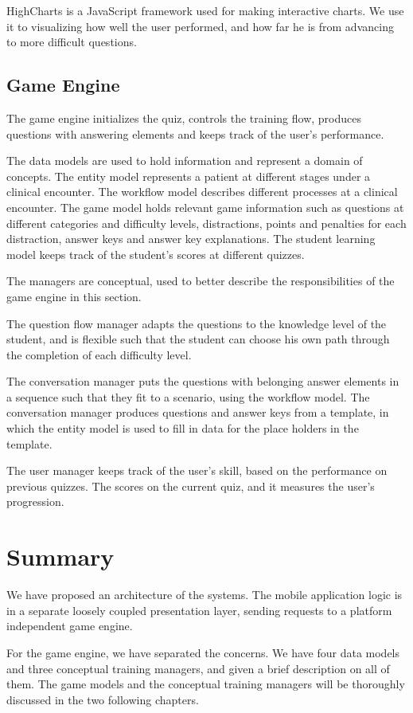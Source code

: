 HighCharts \parencite{Highsoft} is a JavaScript framework used for making interactive charts. We use it to visualizing how well the user performed, and how far he is from advancing to more difficult questions.  

\subsection{Game Engine} 
The game engine initializes the quiz, controls the training flow, produces questions with answering elements and keeps track of the user's performance. 

The data models are used to hold information and represent a domain of concepts. The entity model represents a patient at different stages under a clinical encounter. The workflow model describes different processes at a clinical encounter. The game model holds relevant game information such as questions at different categories and difficulty levels, distractions, points and penalties for each distraction, answer keys and answer key explanations. The student learning model keeps track of the student's scores at different quizzes.

The managers are conceptual, used to better describe the responsibilities of the game engine in this section. 

The question flow manager adapts the questions to the knowledge level of the student, and is flexible such that the student can choose his own path through the completion of each difficulty level. 

The conversation manager puts the questions with belonging answer elements in a sequence such that they fit to a scenario, using the workflow model. The conversation manager produces questions and answer keys from a template, in which the entity model is used to fill in data for the place holders in the template.

The user manager keeps track of the user's skill, based on the performance on previous quizzes. The scores on the current quiz, and it measures the user's progression. 

\section{Summary}
We have proposed an architecture of the systems. The mobile application logic is in a separate loosely coupled presentation layer, sending requests to a platform independent game engine. 

For the game engine, we have separated the concerns. We have four data models and three conceptual training managers, and given a brief description on all of them. The game models and the conceptual training managers will be thoroughly discussed in the two following chapters.